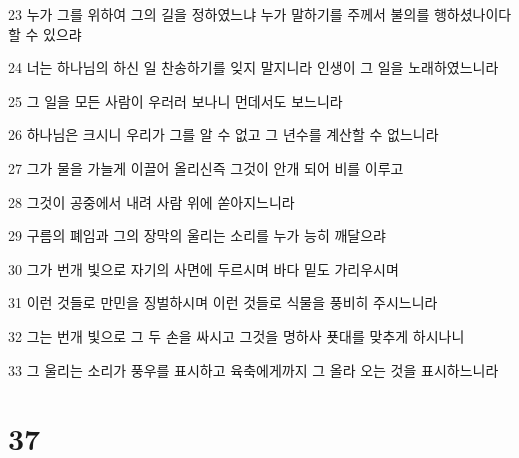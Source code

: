 \par 23 누가 그를 위하여 그의 길을 정하였느냐 누가 말하기를 주께서 불의를 행하셨나이다 할 수 있으랴
\par 24 너는 하나님의 하신 일 찬송하기를 잊지 말지니라 인생이 그 일을 노래하였느니라
\par 25 그 일을 모든 사람이 우러러 보나니 먼데서도 보느니라
\par 26 하나님은 크시니 우리가 그를 알 수 없고 그 년수를 계산할 수 없느니라
\par 27 그가 물을 가늘게 이끌어 올리신즉 그것이 안개 되어 비를 이루고
\par 28 그것이 공중에서 내려 사람 위에 쏟아지느니라
\par 29 구름의 폐임과 그의 장막의 울리는 소리를 누가 능히 깨달으랴
\par 30 그가 번개 빛으로 자기의 사면에 두르시며 바다 밑도 가리우시며
\par 31 이런 것들로 만민을 징벌하시며 이런 것들로 식물을 풍비히 주시느니라
\par 32 그는 번개 빛으로 그 두 손을 싸시고 그것을 명하사 푯대를 맞추게 하시나니
\par 33 그 울리는 소리가 풍우를 표시하고 육축에게까지 그 올라 오는 것을 표시하느니라

\chapter{37}

